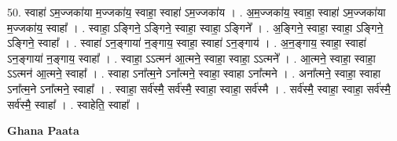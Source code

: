\documentclass[17pt]{extarticle}
\begin{document}
50. स्वाहा॑ ऽम॒ज्जका॑या म॒ज्जका॑य॒ स्वाहा॒ स्वाहा॑ ऽम॒ज्जका॑य । . अ॒म॒ज्जका॑य॒ स्वाहा॒ स्वाहा॑ ऽम॒ज्जका॑या म॒ज्जका॑य॒ स्वाहा᳚ । . स्वाहा॒ ऽङ्गिने॒ ऽङ्गिने॒ स्वाहा॒ स्वाहा॒ ऽङ्गिने᳚ । . अ॒ङ्गिने॒ स्वाहा॒ स्वाहा॒ ऽङ्गिने॒ ऽङ्गिने॒ स्वाहा᳚ । . स्वाहा॑ ऽन॒ङ्गाया॑ न॒ङ्गाय॒ स्वाहा॒ स्वाहा॑ ऽन॒ङ्गाय॑ । . अ॒न॒ङ्गाय॒ स्वाहा॒ स्वाहा॑ ऽन॒ङ्गाया॑ न॒ङ्गाय॒ स्वाहा᳚ । . स्वाहा॒ ऽऽत्मन॑ आ॒त्मने॒ स्वाहा॒ स्वाहा॒ ऽऽत्मने᳚ । . आ॒त्मने॒ स्वाहा॒ स्वाहा॒ ऽऽत्मन॑ आ॒त्मने॒ स्वाहा᳚ । . स्वाहा ऽना᳚त्म॒ने ऽना᳚त्मने॒ स्वाहा॒ स्वाहा ऽना᳚त्मने । . अना᳚त्मने॒ स्वाहा॒ स्वाहा ऽना᳚त्म॒ने ऽना᳚त्मने॒ स्वाहा᳚ । . स्वाहा॒ सर्व॑स्मै॒ सर्व॑स्मै॒ स्वाहा॒ स्वाहा॒ सर्व॑स्मै । . सर्व॑स्मै॒ स्वाहा॒ स्वाहा॒ सर्व॑स्मै॒ सर्व॑स्मै॒ स्वाहा᳚ । . स्वाहेति॒ स्वाहा᳚ । \newline

\textbf{Ghana Paata } \newline
\end{document}
